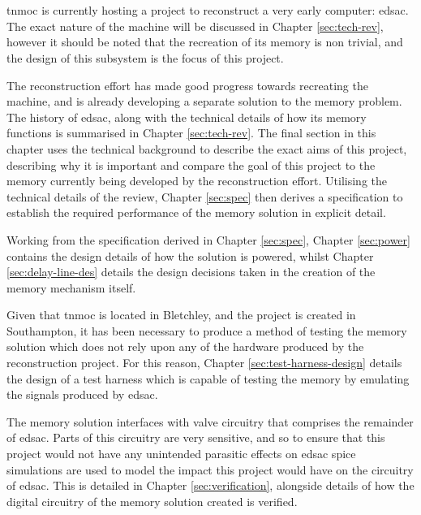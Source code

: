 
\chapter{} \label{sec:intro}
\gls{tnmoc} is currently hosting a project to reconstruct a very early computer: \gls{edsac}. The exact nature of the machine will be discussed in Chapter \ref{sec:tech-rev}, however it should be noted that the recreation of its memory is non trivial, and the design of this subsystem is the focus of this project.

The reconstruction effort has made good progress towards recreating the machine, and is already developing a separate solution to the memory problem. The history of \gls{edsac}, along with the technical details of how its memory functions is summarised in Chapter \ref{sec:tech-rev}. The final section in this chapter uses the technical background to describe the exact aims of this project, describing why it is important and compare the goal of this project to the memory currently being developed by the reconstruction effort. Utilising the technical details of the review, Chapter \ref{sec:spec} then derives a specification to establish the required performance of the memory solution in explicit detail.

Working from the specification derived in Chapter \ref{sec:spec}, Chapter \ref{sec:power} contains the design details of how the solution is powered, whilst Chapter \ref{sec:delay-line-des} details the design decisions taken in the creation of the memory mechanism itself.

Given that \gls{tnmoc} is located in Bletchley, and the project is created in Southampton, it has been necessary to produce a method of testing the memory solution which does not rely upon any of the hardware produced by the reconstruction project. For this reason, Chapter \ref{sec:test-harness-design} details the design of a test harness which is capable of testing the memory by emulating the signals produced by \gls{edsac}.

The memory solution interfaces with valve circuitry that comprises the remainder of \gls{edsac}. Parts of this circuitry are very sensitive, and so to ensure that this project would not have any unintended parasitic effects on \gls{edsac} \gls{spice} simulations are used to model the impact this project would have on the circuitry of \gls{edsac}. This is detailed in Chapter \ref{sec:verification}, alongside details of how the digital circuitry of the memory solution created is verified.

